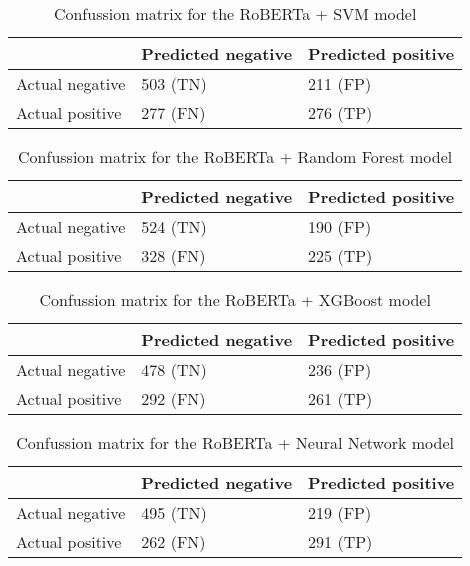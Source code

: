 \begin{table}[H]
\centering
{
\makegapedcells
\begin{tabular}{lll}
                & Predicted negative & Predicted positive \\
\hline
Actual negative & 503 (TN)           & 211 (FP) \\
Actual positive & 277 (FN)           & 276 (TP) \\
\hline
\end{tabular}
}
\caption{Confussion matrix for the RoBERTa + SVM model}
\label{robertasvm_cm}
\end{table}

\begin{table}[H]
\centering
{
\makegapedcells
\begin{tabular}{lll}
                & Predicted negative & Predicted positive \\
\hline
Actual negative & 524 (TN)           & 190 (FP) \\
Actual positive & 328 (FN)           & 225 (TP) \\
\hline
\end{tabular}
}
\caption{Confussion matrix for the RoBERTa + Random Forest model}
\label{robertarf_cm}
\end{table}

\begin{table}[H]
\centering
{
\makegapedcells
\begin{tabular}{lll}
                & Predicted negative & Predicted positive \\
\hline
Actual negative & 478 (TN)           & 236 (FP) \\
Actual positive & 292 (FN)           & 261 (TP) \\
\hline
\end{tabular}
}
\caption{Confussion matrix for the RoBERTa + XGBoost model}
\label{robertaxgb_cm}
\end{table}

\begin{table}[H]
\centering
{
\makegapedcells
\begin{tabular}{lll}
                & Predicted negative & Predicted positive \\
\hline
Actual negative & 495 (TN)           & 219 (FP) \\
Actual positive & 262 (FN)           & 291 (TP) \\
\hline
\end{tabular}
}
\caption{Confussion matrix for the RoBERTa + Neural Network model}
\label{robertann_cm}
\end{table}



